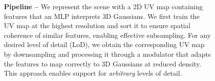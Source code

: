 \begin{figure}
  \centering
  \clogpipelinefig
  \caption[Pipeline of \clog]{
    \textbf{Pipeline --}
    We represent the scene with a 2D UV map containing features that an MLP
    interprets 3D Gaussians.
    We first train the UV map at the highest resolution and sort it to ensure
    spatial coherence of similar features, enabling effective subsampling.
    For any desired level of detail (LoD), we obtain the corresponding UV map by
    downsampling and processing it through a modulator that adapts the features to
    map correctly to 3D Gaussians at reduced density.
    This approach enables support for \emph{arbitrary} levels of detail.
  }
  \label{fig:clog-pipeline}
\end{figure}